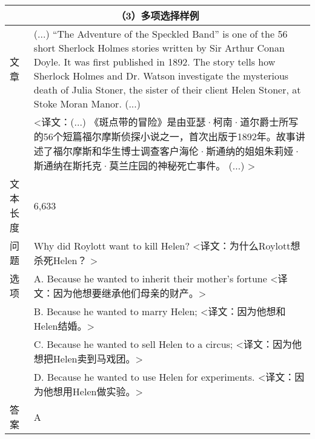 \begin{table}[]
\begin{tabular}{p{48pt}|p{360pt}}
         \hline
         \multicolumn{2}{c}{\bfseries （3）多项选择样例} \\
         \hline
         文章 & (...) “The Adventure of the Speckled Band” is one of the 56 short Sherlock Holmes stories written by Sir Arthur Conan Doyle. It was first published in 1892. The story tells how Sherlock Holmes and Dr. Watson investigate the mysterious death of Julia Stoner, the sister of their client Helen Stoner, at Stoke Moran Manor. (...) \\
          & <译文：(...) 《斑点带的冒险》是由亚瑟·柯南·道尔爵士所写的56个短篇福尔摩斯侦探小说之一，首次出版于1892年。故事讲述了福尔摩斯和华生博士调查客户海伦·斯通纳的姐姐朱莉娅·斯通纳在斯托克·莫兰庄园的神秘死亡事件。 (...) > \\
         \hline
         文本长度 & 6,633 \\
         \hline
         问题 & Why did Roylott want to kill Helen? <译文：为什么Roylott想杀死Helen？ > \\
         \hline
         选项 & A. Because he wanted to inherit their mother’s fortune <译文：因为他想要继承他们母亲的财产。> \\
          & B. Because he wanted to marry Helen; <译文：因为他想和Helen结婚。> \\
          & C. Because he wanted to sell Helen to a circus; <译文：因为他想把Helen卖到马戏团。> \\
          & D. Because he wanted to use Helen for experiments. <译文：因为他想用Helen做实验。> \\
         \hline
         答案 & A \\
         \hline
    \end{tabular}
    \label{tab:2-1}
\end{table}
